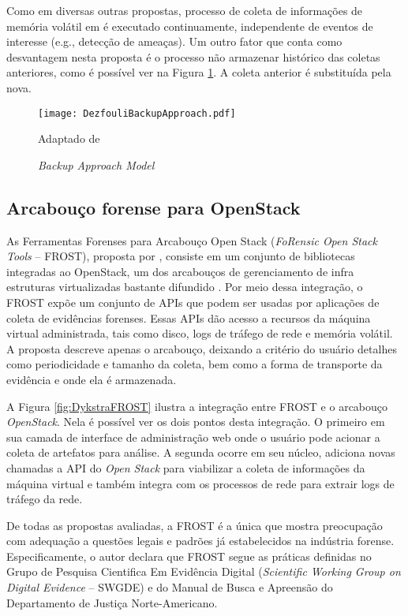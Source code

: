 Como em diversas outras propostas, processo de coleta de informações de memória volátil em \cite{DezfouliBackupApproach:2012} é executado continuamente, independente de eventos de interesse (e.g., detecção de ameaças). 
%
Um outro fator que conta como desvantagem nesta proposta é o processo não armazenar histórico das coletas anteriores, como é possível ver na Figura \ref{fig:DezfouliBackupApproach}. A coleta anterior é substituída pela nova.
%


\begin{figure}[htb!]
\footnotesize
\caption{\textit{Backup Approach Model}}
\texttt{[image: DezfouliBackupApproach.pdf]}
\centering
\label{fig:DezfouliBackupApproach}
\begin{center}
Adaptado de \cite{DezfouliBackupApproach:2012} 
\end{center}
\end{figure}


\subsection{Arcabouço forense para OpenStack}
\label{sec:frost}

As Ferramentas Forenses para Arcabouço Open Stack (\textit{FoRensic Open Stack Tools} -- FROST), proposta por \cite{DykstraFROST:2013}, consiste em um conjunto de bibliotecas integradas ao OpenStack, um dos arcabouços de gerenciamento de infra estruturas virtualizadas bastante difundido \cite{StackFramework:2018}.
%
Por meio dessa integração, o FROST expõe um conjunto de APIs que podem ser usadas por aplicações de coleta de evidências forenses.
%
Essas APIs dão acesso a recursos da máquina virtual administrada, tais como disco, logs de tráfego de rede e memória volátil.
%
A proposta descreve apenas o arcabouço, deixando a critério do usuário detalhes como periodicidade e tamanho da coleta, bem como a forma de transporte da evidência e onde ela é armazenada.


A Figura \ref{fig:DykstraFROST} ilustra a integração entre FROST e o arcabouço \textit{OpenStack}.
%
Nela é possível ver os dois pontos desta integração. O primeiro em sua camada de interface de administração web onde o usuário pode acionar a coleta de artefatos para análise.
%
A segunda ocorre em seu núcleo, adiciona novas chamadas a API do \textit{Open Stack} para viabilizar a coleta de informações da máquina virtual e também integra com os processos de rede para extrair logs de tráfego da rede.


De todas as propostas avaliadas, a FROST é a única que mostra preocupação com adequação a questões legais e padrões já estabelecidos na indústria forense.
%
Especificamente, o autor declara que FROST segue as práticas definidas no Grupo de Pesquisa Cientifica Em Evidência Digital (\textit{Scientific Working Group on Digital Evidence} -- SWGDE) e do Manual de Busca e Apreensão do Departamento de Justiça Norte-Americano.
%


